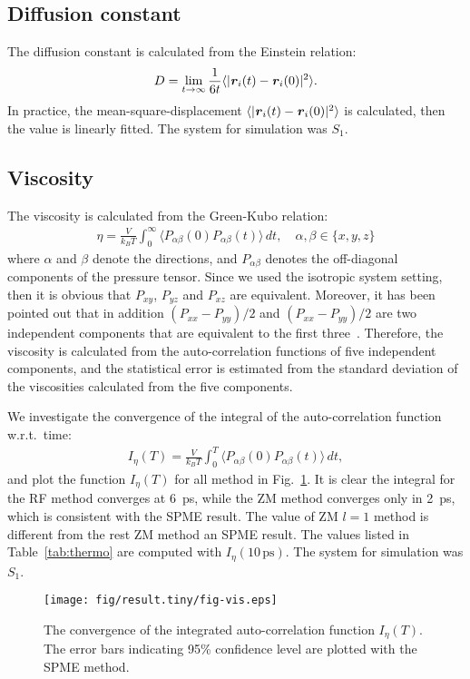 \documentclass[aip,jcp,a4paper,preprint,unsortedaddress,onecolumn,fleqn]{revtex4-1}
\newcommand{\vect}[1]{\textbf{\textit{#1}}}
\newcommand{\systemsb}{S_1}
\begin{document}
\subsection{Diffusion constant}
The diffusion constant is calculated from the Einstein relation:
\begin{align}
  D = \lim_{t\rightarrow \infty}\frac {1}{6t} \langle \vert \vect r_i(t) - \vect r_i(0)\vert^2\rangle.
\end{align}
In practice, the mean-square-displacement $\langle\vert \vect r_i(t) - \vect
r_i(0)\vert^2\rangle$ is calculated, then the value is linearly fitted. The system for simulation was $\systemsb$.

\subsection{Viscosity}
The viscosity is calculated from the Green-Kubo relation:
\begin{align}
  \eta = \frac{V}{k_BT}\int_0^\infty\langle P_{\alpha\beta}(0) P_{\alpha\beta}(t)\rangle\,dt, \quad \alpha,\beta \in \{x, y, z\}
\end{align}
where $\alpha$ and $\beta$ denote the directions, and
$P_{\alpha\beta}$ denotes the off-diagonal components of the pressure
tensor. Since we used the isotropic system setting, then it is obvious
that $P_{xy}$, $P_{yz}$ and $P_{xz}$ are equivalent. Moreover, it has
been pointed out that in addition $(P_{xx} - P_{yy})/2$ and $(P_{xx} -
P_{yy})/2$ are two independent components that are equivalent to the
first three~\cite{alfe1998first}. Therefore, the viscosity is
calculated from the auto-correlation functions of five independent
components, and the statistical error is estimated from the standard
deviation of the viscosities calculated from the five components.

We investigate the convergence of the integral of the auto-correlation function w.r.t.~time:
\begin{align}
  I_\eta(T) = \frac{V}{k_BT}\int_0^T\langle P_{\alpha\beta}(0) P_{\alpha\beta}(t)\rangle\,dt,
\end{align}
and plot the function $I_\eta(T) $ for all method in
Fig.~\ref{fig:conv-vis}.  It is clear the integral for the RF method
converges at 6~ps, while the ZM method converges only in 2~ps, which
is consistent with the SPME result.  The value of ZM $l=1$ method is
different from the rest ZM method an SPME result.
The values listed  in Table~\ref{tab:thermo} are computed with $I_\eta(10\,\textrm{ps})$.
The
system for simulation was $\systemsb$.

\begin{figure}
  \centering
  \texttt{[image: fig/result.tiny/fig-vis.eps]}
  \caption{The convergence of the integrated auto-correlation function $I_\eta(T) $. The error bars indicating 95\% confidence level are plotted with the SPME method.}
  \label{fig:conv-vis}
\end{figure}


\newpage
{}

\end{document}
